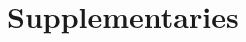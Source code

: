\documentclass[11pt]{article}
\begin{document}
 
\setlength{\abovedisplayskip}{5.5pt}
\setlength{\belowdisplayskip}{6pt}
\onecolumn
\appendix
\section*{Supplementaries}
\renewcommand{\thesubsection}{\Alph{subsection}}
\normalsize


















\nolinenumbers
\end{document}
